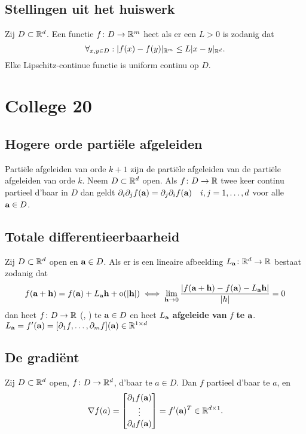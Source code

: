 \documentclass{2wa40summary}
\begin{document}
	
	
	\subsection{Stellingen uit het huiswerk}
	\theorem Zij $D \subset \mathbb{R}^d$. Een functie $f\colon D \to \mathbb{R}^m$ heet  als er een $L>0$ is zodanig dat
	\[\forall _{x,y \in D}: |f(x)-f(y)|_{\mathbb{R}^m} \leq L|x-y|_{\mathbb{R}^d}.\]
	Elke Lipschitz-continue functie is uniform continu op $D$.
	\newpage
	\section{College 20}
	\subsection{Hogere orde parti\"ele afgeleiden}
	 Parti\"ele afgeleiden van orde $k+1$ zijn de parti\"ele afgeleiden van de parti\"ele afgeleiden van orde $k$.
	 Neem $D \subset \mathbb{R}^d$ open. Als $f\colon D \to \mathbb{R}$ twee keer continu partieel d'baar in $D$
        dan geldt $\partial_i \partial_j f({\textbf{a}}) = \partial_j \partial_i f({\textbf{a}}) \quad i,j=1,\dots ,d$ voor alle ${\textbf{a}} \in D$.
	\subsection{Totale differentieerbaarheid}
	 Zij $D \subset \mathbb{R}^d$ open en ${\textbf{a}} \in D$. Als
 er is een lineaire afbeelding $L_{{\textbf{a}}}\colon\mathbb{R}^d \to \mathbb{R}$ bestaat zodanig dat
	\[f({\textbf{a}}+{\textbf{h}})=f({\textbf{a}})+ L_{{\textbf{a}}} {\textbf{h}} +\mathrm{o}({\left|{\textbf{h}}\right|})\iff\lim_{{\textbf{h}}\to0}\frac{{\left|f({\textbf{a}}+{\textbf{h}})-f({\textbf{a}})-L_{{\textbf{a}}} {\textbf{h}}\right|}}{{\left|h\right|}} = 0\]
 dan heet $f\colon D \to \mathbb{R}$  (, ) te ${\textbf{a}} \in D$
	en heet $L_{{\textbf{a}}}$ \textbf{afgeleide van} $f$ \textbf{te} ${\textbf{a}}$.
	\nota $L_{{\textbf{a}}} = f'({\textbf{a}}) = [\partial_1 f,\ldots,\partial_m f]({\textbf{a}})\in\mathbb{R}^{1\times d}$
	\subsection{De gradi\"ent}
	 Zij $D \subset \mathbb{R}^d$ open, $f\colon  D \to \mathbb{R}^d$, d'baar te $a \in D$. Dan $f$ partieel d'baar te $a$, en
\[\nabla f(a)= \begin{bmatrix}
\partial_1 f({\textbf{a}}) \\
\vdots \\
\partial_d f({\textbf{a}})
\end{bmatrix} = f'({\textbf{a}})^{T}\in\mathbb{R}^{d\times 1}.
\]
\end{document}
